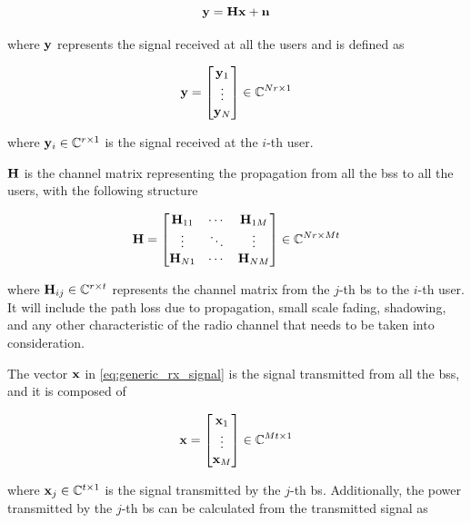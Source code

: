 \begin{equation} \label{eq:generic_system_model}
    \mathbf{y} = \mathbf{H} \mathbf{x} + \mathbf{n}
\end{equation}

\noindent
where $\mathbf{y}$ represents the signal received at all the users and is defined as

\begin{equation} \label{eq:generic_rx_signal}
    \mathbf{y} = \begin{bmatrix}
            \mathbf{y}_1\\
            \vdots\\
            \mathbf{y}_N
        \end{bmatrix} \in \mathbb{C}^{Nr \times 1}
\end{equation}

\noindent
where $\mathbf{y}_i \in \mathbb{C}^{r \times 1}$ is the signal received at the $i$-th user.

$\mathbf{H}$ is the channel matrix representing the propagation from all the \glspl{bs}
to all the users, with the following structure

\begin{equation} \label{eq:generic_ch_mat}
    \mathbf{H} = \begin{bmatrix}
            \mathbf{H}_{11} & \cdots & \mathbf{H}_{1M}\\
            \vdots   & \ddots & \vdots\\
            \mathbf{H}_{N1}  & \cdots & \mathbf{H}_{NM}
    \end{bmatrix} \in \mathbb{C}^{Nr \times Mt}
\end{equation}

\noindent
where $\mathbf{H}_{ij} \in \mathbb{C}^{r \times t}$ represents the channel matrix from the
$j$-th \gls{bs} to the $i$-th user. It will include the path loss due to
propagation, small scale fading, shadowing, and any other characteristic of
the radio channel that needs to be taken into consideration.

The vector $\mathbf{x}$ in \eqref{eq:generic_rx_signal} is the signal transmitted from
all the \glspl{bs}, and it is composed of

\begin{equation} \label{eq:generic_tx_signal}
    \mathbf{x} = \begin{bmatrix}
        \mathbf{x}_1 \\
        \vdots \\
        \mathbf{x}_M
    \end{bmatrix} \in \mathbb{C}^{Mt \times 1}
\end{equation}

\noindent
where $\mathbf{x}_j \in \mathbb{C}^{t \times 1}$ is the signal transmitted by the $j$-th
\gls{bs}. Additionally, the power transmitted by the $j$-th \gls{bs} can be
calculated from the transmitted signal as

